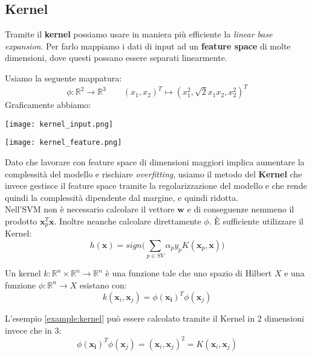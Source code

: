 \subsection{Kernel}
Tramite il \textbf{kernel} possiamo usare in maniera più efficiente la \textit{linear base expansion}. Per farlo mappiamo i dati di input ad un \textbf{feature space} di molte dimensioni, dove questi possano essere separati linearmente.
\begin{example}[Kernel]
	\label{example:kernel}
	Usiamo la seguente mappatura:
	\begin{equation*}
		\phi: \mathbb{R}^2 \to \mathbb{R}^3 \quad\quad (x_1, x_2)^T \mapsto (x_1^2,\sqrt{2}x_1x_2,x_2^2)^T
	\end{equation*}
	Graficamente abbiamo:
	\begin{center}
		\begin{minipage}{0.48\linewidth}
			\centering
			\texttt{[image: kernel\_input.png]}
		\end{minipage}
		\begin{minipage}{0.48\linewidth}
			\centering
			\texttt{[image: kernel\_feature.png]}
		\end{minipage}
	\end{center}
\end{example}
Dato che lavorare con feature space di dimensioni maggiori implica aumentare la complessità del modello e rischiare \textit{overfitting}, usiamo il metodo del \textbf{Kernel} che invece gestisce il feature space tramite la regolarizzazione del modello e che rende quindi la complessità dipendente dal margine, e quindi ridotta.\\
Nell'SVM non è necessario calcolare il vettore $\mathbf{w}$ e di conseguenze nemmeno il prodotto $\mathbf{x}_p^T\mathbf{x}$. Inoltre neanche calcolare direttamente $\phi$. È sufficiente utilizzare il Kernel:
\begin{equation}
	h(\mathbf{x})=sign\bigg(\sum_{p\in SV}\alpha_p y_p K(\mathbf{x}_p,\mathbf{x})\bigg)
\end{equation}
\begin{definition}[Kernel]
	Un kernel $k: \mathbb{R}^n \times \mathbb{R}^n \to \mathbb{R}^n$ è una funzione tale che uno spazio di Hilbert $X$ e una funzione $\phi : \mathbb{R}^n\to X$ esistano con:
	\begin{equation}
		k(\mathbf{x}_i, \mathbf{x}_j)=\phi(\mathbf{x_i})^T\phi(\mathbf{x}_j)
	\end{equation}
\end{definition}
\begin{example}
	L'esempio \ref{example:kernel} può essere calcolato tramite il Kernel in 2 dimensioni invece che in 3:
	\begin{equation*}
		\phi(\mathbf{x_i})^T\phi(\mathbf{x}_j) = (\mathbf{x}_i, \mathbf{x}_j)^2 = K(\mathbf{x}_i, \mathbf{x}_j)
	\end{equation*}
\end{example}
